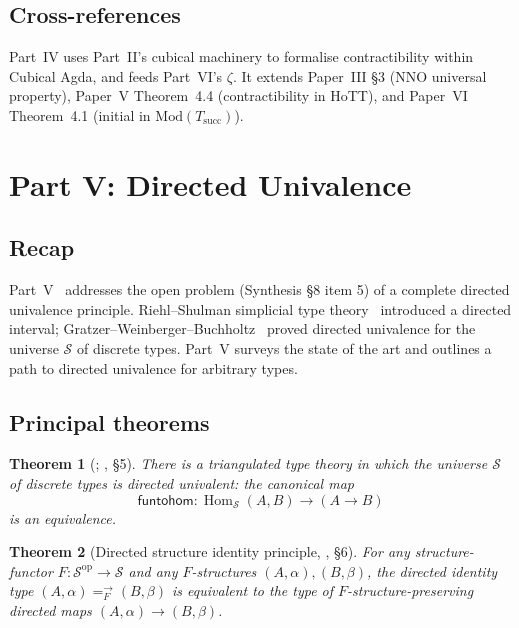 \documentclass[12pt]{article}
\newtheorem{theorem}{Theorem}[section]
\theoremstyle{definition}
\theoremstyle{remark}
\newcommand{\Spc}{\mathcal{S}}
\newcommand{\op}{\mathrm{op}}
\DeclareMathOperator{\Hom}{Hom}
\newcommand{\funtohom}{\mathsf{funtohom}}
\begin{document}
\subsection{Cross-references}

Part~IV uses Part~II's cubical machinery to formalise contractibility
within Cubical Agda, and feeds Part~VI's $\zeta$. It extends Paper~III
\S 3 (NNO universal property), Paper~V Theorem~4.4 (contractibility in
HoTT), and Paper~VI Theorem~4.1 (initial in $\mathrm{Mod}(T_{\mathrm{succ}})$).

\section{Part V: Directed Univalence}\label{sec:partV}

\subsection{Recap}

Part~V~\cite{directedUnivalence} addresses the open problem (Synthesis
\S 8 item 5) of a complete directed univalence principle. Riehl--Shulman
simplicial type theory~\cite{RiehlShulman} introduced a directed
interval; Gratzer--Weinberger--Buchholtz~\cite{GWB2024} proved directed
univalence for the universe $\Spc$ of discrete types. Part~V surveys the
state of the art and outlines a path to directed univalence for arbitrary
types.

\subsection{Principal theorems}

\begin{theorem}[\cite{GWB2024}; \cite{directedUnivalence}, \S 5]
There is a triangulated type theory in which the universe $\Spc$ of discrete
types is directed univalent: the canonical map
\[
\funtohom : \Hom_{\Spc}(A, B) \to (A \to B)
\]
is an equivalence.
\end{theorem}

\begin{theorem}[Directed structure identity principle,
\cite{directedUnivalence}, \S 6]
For any structure-functor $F : \Spc^{\op} \to \Spc$ and any $F$-structures
$(A, \alpha), (B, \beta)$, the directed identity type
$(A,\alpha) =_F^{\to} (B,\beta)$ is equivalent to the type of
$F$-structure-preserving directed maps $(A, \alpha) \to (B, \beta)$.
\end{theorem}
\end{document}
